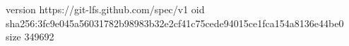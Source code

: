 version https://git-lfs.github.com/spec/v1
oid sha256:3fc9e045a56031782b98983b32e2cf41c75cede94015ce1fca154a8136e44be0
size 349692
